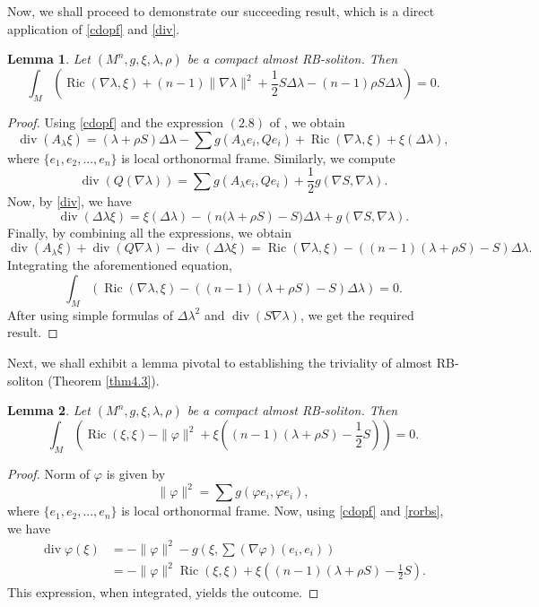 \documentclass[a4paper, twoside, 10pt]{article}
\numberwithin{equation}{section}
\newtheorem{lemma}{Lemma}[section]
\theoremstyle{definition}
\begin{document}
Now, we shall proceed to demonstrate our succeeding result, which is a direct application of  \eqref{cdopf} and \eqref{div}.
\begin{lemma}\label{lem4}
    Let $(M^n,g,\xi,\lambda,\rho)$ be a compact almost RB-soliton. Then 
    $$
    \int_M\left(\operatorname{Ric}(\nabla\lambda,\xi)+(n-1)\|\nabla\lambda\|^2+\frac{1}{2}S\Delta\lambda-(n-1)\rho S \Delta \lambda\right)=0.
    $$
\end{lemma}
\begin{proof}
Using \eqref{cdopf} and  the expression $(2.8)$ of \cite{SDANARS}, we obtain
\[
\operatorname{div}(A_\lambda\xi)=(\lambda +\rho S)\Delta\lambda-\sum g\left(A_\lambda e_i,Qe_i\right)+\operatorname{Ric}(\nabla\lambda,\xi)+\xi(\Delta\lambda),
\]
where $\{e_1,e_2,...,e_n\}$ is local orthonormal frame. Similarly, we compute
$$
\operatorname{div}(Q(\nabla\lambda))=\sum g\left(A_\lambda e_i,Qe_i\right)+\frac{1}{2}g(\nabla S,\nabla\lambda).
$$
Now, by \eqref{div}, we have     
\[
\operatorname{div}(\Delta\lambda\xi)=\xi(\Delta\lambda)-\left(n(\lambda+\rho S\right)-S)\Delta\lambda+g(\nabla S,\nabla\lambda).
\]
Finally, by combining all the expressions, we obtain
\[
\operatorname{div}(A_\lambda\xi) +\operatorname{div}(Q\nabla\lambda)-\operatorname{div}(\Delta\lambda\xi)=\operatorname{Ric}(\nabla\lambda,\xi)-((n-1)(\lambda+\rho S)-S)\Delta\lambda.
\]
 Integrating the aforementioned equation,
\[
\int_M\left(\operatorname{Ric}(\nabla\lambda,\xi)-((n-1)(\lambda+\rho S)-S)\Delta\lambda\right)=0.
\]
After using simple formulas of $\Delta\lambda^2$ and $\operatorname{div}(S\nabla\lambda)$, we get the required result.
\end{proof}


Next, we shall exhibit a lemma pivotal to 
establishing the triviality of almost RB-soliton
(Theorem \ref{thm4.3}).
\begin{lemma}\label{lem5}
Let $(M^n,g,\xi,\lambda,\rho)$ be a compact almost RB-soliton. Then
    \[
    \int_M\left(\operatorname{Ric}(\xi,\xi)-\|\varphi\|^2+\xi((n-1)(\lambda+\rho S)-\frac{1}{2}S)\right)=0.
    \]
\end{lemma}
\begin{proof}
    Norm of $\varphi$ is given by
    $$\|\varphi\|^2=\sum g(\varphi e_i,\varphi e_i),$$
    where $\{e_1,e_2,...,e_n\}$ is local orthonormal frame.
    Now, using  \eqref{cdopf} and \eqref{rorbs}, we have
    \begin{align*}
        \operatorname{div}\varphi(\xi)&=-\|\varphi\|^2-g\left(\xi,\sum(\nabla\varphi)(e_i,e_i)\right)\\
        &=-\|\varphi\|^2\operatorname{Ric}(\xi,\xi)+\xi\left((n-1)(\lambda +\rho S)-\frac{1}{2}S\right).
    \end{align*}
   This expression, when integrated, yields the outcome.
\end{proof}
\end{document}
